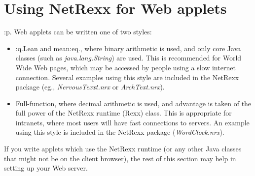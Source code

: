 \chapter{Using NetRexx for Web applets}
:p.
Web applets can be written one of two styles:
\begin{itemize}
\item :q.Lean and mean:eq., where binary arithmetic is used, and only core
Java classes (such as \emph{java.lang.String}) are used.  This is
recommended for World Wide Web pages, which may be accessed by people
using a slow internet connection.
Several examples using this style are included in the NetRexx package
(eg., \emph{NervousTexxt.nrx} or \emph{ArchText.nrx}).
\item Full-function, where decimal arithmetic is used, and advantage is
taken of the full power of the NetRexx runtime (Rexx) class.
This is appropriate for intranets, where most users will have fast
connections to servers.
An example using this style is included in the NetRexx package
(\emph{WordClock.nrx}).
\end{itemize}
If you write applets which use the NetRexx runtime (or any other Java
classes that might not be on the client browser), the rest of this
section may help in setting up your Web server.

